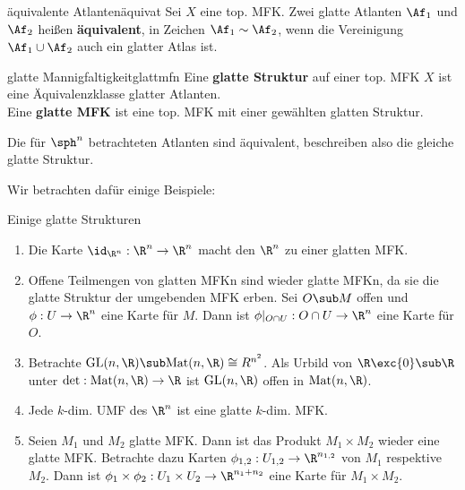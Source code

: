 \begin{definition}{äquivalente Atlanten}{äquivat}
Sei $X$ eine top. MFK. Zwei glatte Atlanten $\Af_1$ und $\Af_2$ heißen \textbf{äquivalent}, in Zeichen $\Af_1 \sim \Af_2$, wenn die Vereinigung $\Af_1 \cup \Af_2$ auch ein glatter Atlas ist.
\end{definition}
\begin{definition}{glatte Mannigfaltigkeit}{glattmfn}
Eine \textbf{glatte Struktur} auf einer top. MFK $X$ ist eine Äquivalenzklasse glatter Atlanten.\\
Eine \textbf{glatte MFK} ist eine top. MFK mit einer gewählten glatten Struktur.
\end{definition}
\begin{bemerkung}
Die für $\sph^n$ betrachteten Atlanten sind äquivalent, beschreiben also die gleiche glatte Struktur.
\end{bemerkung}
Wir betrachten dafür einige Beispiele:
\begin{beispiele} Einige glatte Strukturen
\begin{enumerate}
\item Die Karte $\id_{\R^n}: \R^n \to \R^n$ macht den $\R^n$ zu einer glatten MFK.
\item Offene Teilmengen von glatten MFKn sind wieder glatte MFKn, da sie die glatte Struktur der umgebenden MFK erben. Sei $O \sub M$ offen und $\phi: U \to \R^n$ eine Karte für $M$. Dann ist $\phi |_{O \cap U}: O \cap U \to \R^n$ eine Karte für $O$.
\item Betrachte $\text{GL}(n, \R) \sub \text{Mat}(n, \R) \cong R^{n^2}$. Als Urbild von $\R \exc \{ 0 \} \sub \R$ unter $\text{det}: \text{Mat}(n, \R) \to \R$ ist $\text{GL}(n, \R)$ offen in $\text{Mat}(n, \R)$.
\item Jede $k$-dim. UMF des $\R^n$ ist eine glatte $k$-dim. MFK.
\item Seien $M_1$ und $M_2$ glatte MFK. Dann ist das Produkt $M_1 \times M_2$ wieder eine glatte MFK. Betrachte dazu Karten $\phi_{1,2}: U_{1,2} \to \R^{n_{1,2}}$ von $M_1$ respektive $M_2$. Dann ist $\phi_1 \times \phi_2: U_1 \times U_2 \to \R^{n_1 + n_2}$ eine Karte für $M_1 \times M_2$.
\end{enumerate}
\end{beispiele}
